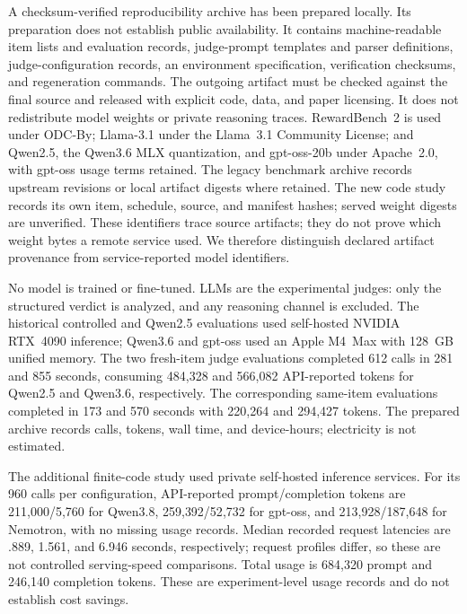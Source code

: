 \documentclass[10pt]{article}
\begin{document}
A checksum-verified reproducibility archive has been prepared locally. Its preparation does not establish public availability. It contains machine-readable item lists and evaluation records, judge-prompt templates and parser definitions, judge-configuration records, an environment specification, verification checksums, and regeneration commands. The outgoing artifact must be checked against the final source and released with explicit code, data, and paper licensing. It does not redistribute model weights or private reasoning traces. RewardBench~2 is used under ODC-By; Llama-3.1 under the Llama~3.1 Community License; and Qwen2.5, the Qwen3.6 MLX quantization, and gpt-oss-20b under Apache~2.0, with gpt-oss usage terms retained. The legacy benchmark archive records upstream revisions or local artifact digests where retained. The new code study records its own item, schedule, source, and manifest hashes; served weight digests are unverified. These identifiers trace source artifacts; they do not prove which weight bytes a remote service used. We therefore distinguish declared artifact provenance from service-reported model identifiers.



No model is trained or fine-tuned. LLMs are the experimental judges: only the structured verdict is analyzed, and any reasoning channel is excluded. The historical controlled and Qwen2.5 evaluations used self-hosted NVIDIA RTX~4090 inference; Qwen3.6 and gpt-oss used an Apple M4~Max with 128~GB unified memory. The two fresh-item judge evaluations completed 612 calls in 281 and 855 seconds, consuming 484{,}328 and 566{,}082 API-reported tokens for Qwen2.5 and Qwen3.6, respectively. The corresponding same-item evaluations completed in 173 and 570 seconds with 220{,}264 and 294{,}427 tokens. The prepared archive records calls, tokens, wall time, and device-hours; electricity is not estimated.

The additional finite-code study used private self-hosted inference services. For its 960 calls per configuration, API-reported prompt/completion tokens are 211{,}000/5{,}760 for Qwen3.8, 259{,}392/52{,}732 for gpt-oss, and 213{,}928/187{,}648 for Nemotron, with no missing usage records. Median recorded request latencies are .889, 1.561, and 6.946 seconds, respectively; request profiles differ, so these are not controlled serving-speed comparisons. Total usage is 684{,}320 prompt and 246{,}140 completion tokens. These are experiment-level usage records and do not establish cost savings.
\end{document}
